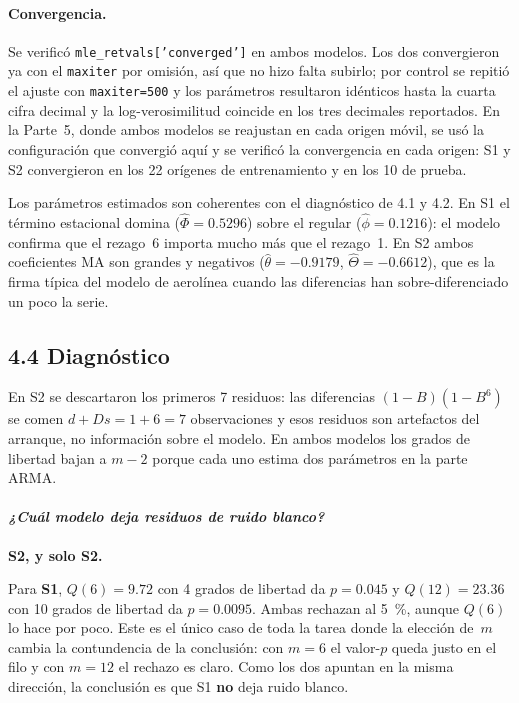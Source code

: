 \documentclass[11pt]{article}
\begin{document}


\paragraph{Convergencia.} Se verific\'o \texttt{mle\_retvals['converged']}
en ambos modelos. Los dos convergieron ya con el \texttt{maxiter} por
omisi\'on, as\'i que no hizo falta subirlo; por control se repiti\'o el
ajuste con \texttt{maxiter=500} y los par\'ametros resultaron id\'enticos
hasta la cuarta cifra decimal y la log-verosimilitud coincide en los tres
decimales reportados. En la Parte~5, donde ambos modelos se reajustan en
cada origen m\'ovil, se us\'o la configuraci\'on que convergi\'o aqu\'i y se
verific\'o la convergencia en cada origen: S1 y S2 convergieron en los
\num{22} or\'igenes de entrenamiento y en los \num{10} de prueba.

Los par\'ametros estimados son coherentes con el diagn\'ostico de 4.1 y 4.2.
En S1 el t\'ermino estacional domina ($\hat\Phi = \num{0.5296}$) sobre el
regular ($\hat\phi = \num{0.1216}$): el modelo confirma que el rezago~6
importa mucho m\'as que el rezago~1. En S2 ambos coeficientes MA son grandes
y negativos ($\hat\theta = \num{-0.9179}$,
$\hat\Theta = \num{-0.6612}$), que es la firma t\'ipica del modelo de
aerol\'inea cuando las diferencias han sobre-diferenciado un poco la serie.

\subsection{4.4 Diagn\'ostico}



En S2 se descartaron los primeros \num{7} residuos: las diferencias
$(1-B)(1-B^6)$ se comen $d + Ds = 1 + 6 = 7$ observaciones y esos residuos
son artefactos del arranque, no informaci\'on sobre el modelo. En ambos
modelos los grados de libertad bajan a $m-2$ porque cada uno estima dos
par\'ametros en la parte ARMA.

\paragraph{{\normalfont\itshape ¿Cu\'al modelo deja residuos de ruido
blanco?}} \textbf{S2, y solo S2.}

Para \textbf{S1}, $Q(6) = \num{9.72}$ con \num{4} grados de libertad da
$p = \num{0.045}$ y $Q(12) = \num{23.36}$ con \num{10} grados de libertad da
$p = \num{0.0095}$. Ambas rechazan al \SI{5}{\percent}, aunque $Q(6)$ lo hace
por poco. Este es el \'unico caso de toda la tarea donde la elecci\'on de~$m$
cambia la contundencia de la conclusi\'on: con $m=6$ el valor-$p$ queda
justo en el filo y con $m=12$ el rechazo es claro. Como los dos apuntan en la
misma direcci\'on, la conclusi\'on es que S1 \textbf{no} deja ruido blanco.
\end{document}
